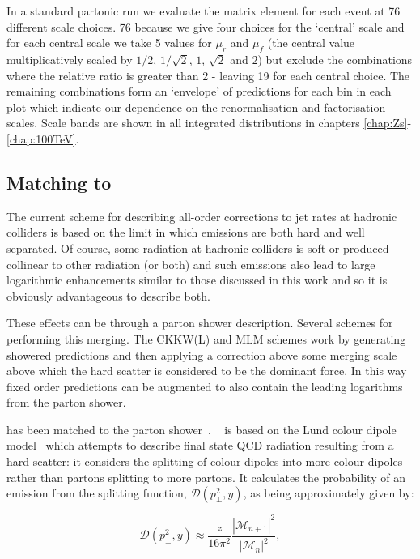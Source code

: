 		In a standard partonic \HEJ
		run we evaluate the matrix element for each event at 76 different scale choices.  76
		because we give four choices for the `central' scale and for each central scale we take 5
		values for $\mu_r$ and $\mu_f$ (the central value multiplicatively scaled by $1/2$, $1/\sqrt{2}$,
		$1$, $\sqrt{2}$ and $2$) but exclude the combinations where the relative ratio is greater
		than 2 - leaving 19 for each central choice.  The remaining combinations form an `envelope' of
		predictions for each bin in each plot which indicate our dependence on the renormalisation and
		factorisation scales.  Scale bands are shown in all integrated distributions in chapters
		\ref{chap:Zs}-\ref{chap:100TeV}.

	\subsection{Matching to \ARIADNE}

		The current scheme for describing all-order corrections to jet rates at hadronic colliders
		is based on the limit in which emissions are both hard and well separated.  Of course, some
		radiation at hadronic colliders is soft or produced collinear to other radiation (or both) and
		such emissions also lead to large logarithmic enhancements similar to those discussed in this
		work and so it is obviously advantageous to describe both.

		These effects can be through a parton shower description.  Several schemes for performing this
		merging.  The CKKW(L) and MLM schemes work by generating showered predictions and then applying
		a correction above some merging scale above which the hard scatter is considered to be the
		dominant force.  In this way fixed order predictions can be augmented to also contain the leading
		logarithms from the parton shower.

		\HEJ has been matched to the \ARIADNE parton shower~\cite{Andersen:2011zd}.  \ARIADNE~\cite{Lonnblad:1992tz}
		is based on the Lund colour dipole model~\cite{Gustafson:180791} which attempts to describe final state QCD
		radiation resulting from a hard scatter: it considers the splitting of colour dipoles into more colour
		dipoles rather than partons splitting to more partons.  It calculates the probability of an emission from
		the splitting function, $\mathcal{D}(p_\perp^2, y)$, as being approximately given by:

		\begin{equation}
			\mathcal{D}(p_\perp^2, y) \approx \frac{z}{16\pi^2}
			\frac{|\mathcal{M}_{n+1}|^2}{|\mathcal{M}_{n}|^2},
		\end{equation}

